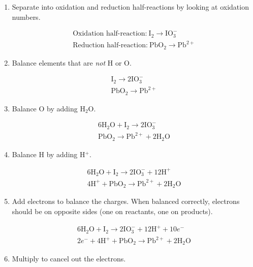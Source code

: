 \documentclass[a4paper, 12pt]{article}
\begin{document}
\begin{enumerate}[leftmargin=*]
\item Separate into oxidation and reduction half-reactions by looking at oxidation numbers.

\begin{gather*}
\text{Oxidation half-reaction:} \: \text{I}_2 \longrightarrow \text{IO}_3^- \\
\text{Reduction half-reaction:} \: \text{PbO}_2 \longrightarrow \text{Pb}^{2+}
\end{gather*}

\item Balance elements that are \textit{not} H or O.

\begin{gather*}
\text{I}_2 \longrightarrow 2\text{IO}_3^- \\
\text{PbO}_2 \longrightarrow \text{Pb}^{2+}
\end{gather*}

\item Balance O by adding H$_2$O.

\begin{gather*}
6\text{H$_2$O} + \text{I}_2 \longrightarrow 2\text{IO}_3^- \\
\text{PbO}_2 \longrightarrow \text{Pb}^{2+} + 2\text{H$_2$O}
\end{gather*}

\item Balance H by adding H$^+$.

\begin{gather*}
6\text{H$_2$O} + \text{I}_2 \longrightarrow 2\text{IO}_3^- + 12\text{H}^+\\
4\text{H}^+ + \text{PbO}_2 \longrightarrow \text{Pb}^{2+} + 2\text{H$_2$O}
\end{gather*}

\item Add electrons to balance the charges. When balanced correctly, electrons should be on opposite sides (one on reactants, one on products). 

\begin{gather*}
6\text{H$_2$O} + \text{I}_2 \longrightarrow 2\text{IO}_3^- + 12\text{H}^+ + 10e^-\\
2e^- + 4\text{H}^+ + \text{PbO}_2 \longrightarrow \text{Pb}^{2+} + 2\text{H$_2$O}
\end{gather*}

\item Multiply to cancel out the electrons.


\end{enumerate}
\end{document}
